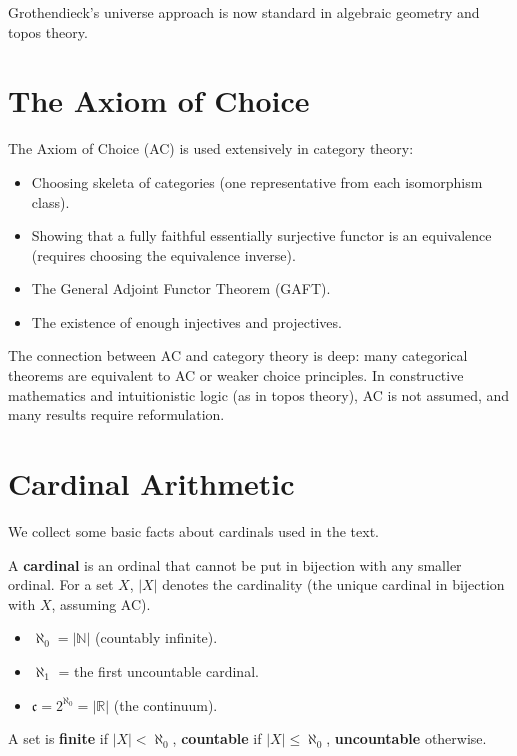 Grothendieck's universe approach is now standard in algebraic geometry and topos theory.

\section{The Axiom of Choice}

The Axiom of Choice (AC) is used extensively in category theory:
\begin{itemize}
  \item Choosing skeleta of categories (one representative from each isomorphism class).
  \item Showing that a fully faithful essentially surjective functor is an equivalence (requires choosing the equivalence inverse).
  \item The General Adjoint Functor Theorem (GAFT).
  \item The existence of enough injectives and projectives.
\end{itemize}

The connection between AC and category theory is deep: many categorical theorems are equivalent to AC or weaker choice principles. In constructive mathematics and intuitionistic logic (as in topos theory), AC is not assumed, and many results require reformulation.

\section{Cardinal Arithmetic}

We collect some basic facts about cardinals used in the text.

\begin{definition}
A \textbf{cardinal} is an ordinal that cannot be put in bijection with any smaller ordinal. For a set $X$, $|X|$ denotes the cardinality (the unique cardinal in bijection with $X$, assuming AC).

\begin{itemize}
  \item $\aleph_0 = |\mathbb{N}|$ (countably infinite).
  \item $\aleph_1$ = the first uncountable cardinal.
  \item $\mathfrak{c} = 2^{\aleph_0} = |\mathbb{R}|$ (the continuum).
\end{itemize}

A set is \textbf{finite} if $|X| < \aleph_0$, \textbf{countable} if $|X| \leq \aleph_0$, \textbf{uncountable} otherwise.
\end{definition}

